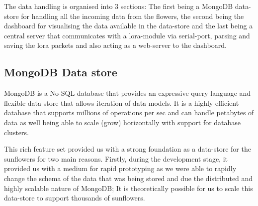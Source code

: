 The data handling is organised into 3 sections: The first being a MongoDB data-store for handling all the incoming data from the flowers, the second being the dashboard for visualising the data available in the data-store and the last being a central server that communicates with a lora-module via serial-port, parsing and saving the lora packets and also acting as a web-server to the dashboard.

\subsection{MongoDB Data store}
MongoDB is a No-SQL database that provides an expressive query language and flexible data-store that allows iteration of data models. It is a highly efficient database that supports millions of operations per sec and can handle petabytes of data as well being able to scale (grow) horizontally with support for database clusters.

This rich feature set provided us with a strong foundation as a data-store for the sunflowers for two main reasons. Firstly, during the development stage, it provided us with a medium for rapid prototyping as we were able to rapidly change the schema of the data that was being stored and 
due the distributed and highly scalable nature of MongoDB; It is theoretically possible for us to scale this data-store to support thousands of sunflowers.

